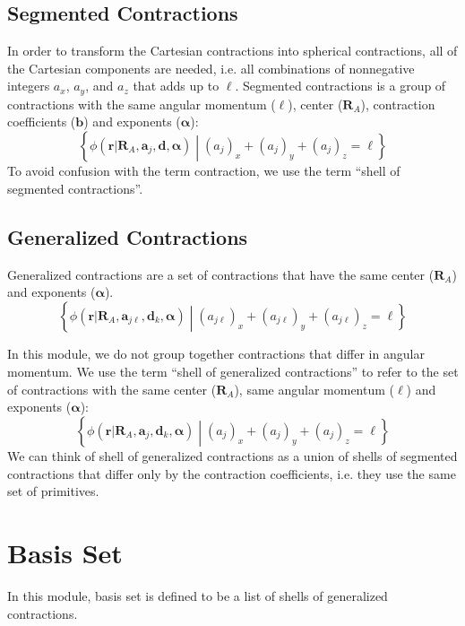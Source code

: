 \documentclass[letterpaper]{article}
\begin{document}
\subsection{Segmented Contractions}
In order to transform the Cartesian contractions into spherical
contractions, all of the Cartesian components are needed, i.e. all
combinations of nonnegative integers $a_x$, $a_y$, and $a_z$ that adds up to
$\ell$.
Segmented contractions is a group of contractions with the same angular momentum
($\ell$), center ($\mathbf{R}_A$), contraction coefficients ($\mathbf{b}$) and
exponents ($\boldsymbol{\alpha}$):
\begin{equation}
  \label{eq:seg_contraction}
  \left\{
    \phi (\mathbf{r} | \mathbf{R}_A, \mathbf{a}_j, \mathbf{d}, \boldsymbol{\alpha})
    \middle|
    (a_j)_x + (a_j)_y + (a_j)_z = \ell
  \right\}
\end{equation}
To avoid confusion with the term contraction, we use the term ``shell of
segmented contractions''.

\subsection{Generalized Contractions}
Generalized contractions are a set of contractions that have the same center
($\mathbf{R}_A$) and exponents
($\boldsymbol{\alpha}$).
\begin{equation}
  \label{eq:gen_contraction}
  \left\{
    \phi (\mathbf{r} | \mathbf{R}_A, \mathbf{a}_{j\ell}, \mathbf{d}_k, \boldsymbol{\alpha})
    \middle|
    (a_{j\ell})_x + (a_{j\ell})_y + (a_{j\ell})_z = \ell
  \right\}
\end{equation}

In this module, we do not group together contractions that differ in angular momentum.
We use the term ``shell of generalized contractions'' to refer to the set of
contractions with the same center ($\mathbf{R}_A$), same angular momentum
($\ell$) and exponents ($\boldsymbol{\alpha}$):
\begin{equation}
  \label{eq:gen_contraction}
  \left\{
    \phi (\mathbf{r} | \mathbf{R}_A, \mathbf{a}_j, \mathbf{d}_k, \boldsymbol{\alpha})
    \middle|
    (a_j)_x + (a_j)_y + (a_j)_z = \ell
  \right\}
\end{equation}
We can think of shell of generalized contractions as a union of shells of
segmented contractions that differ only by the contraction coefficients, i.e.
they use the same set of primitives.

\section{Basis Set}
In this module, basis set is defined to be a list of shells of generalized
contractions.
\end{document}
